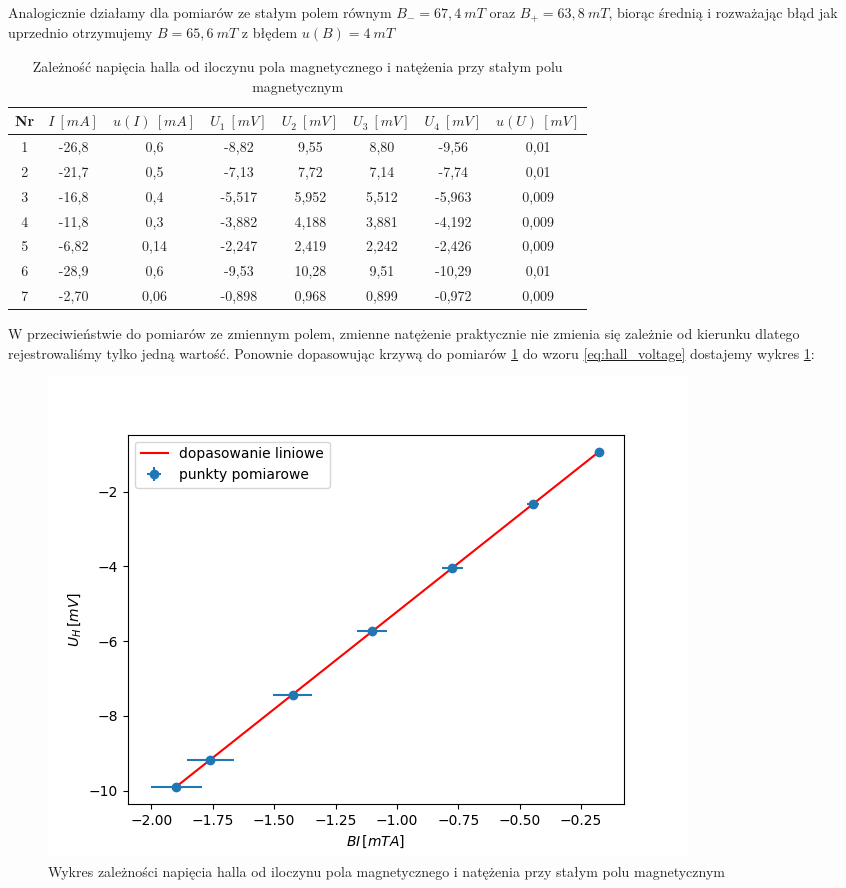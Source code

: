 \documentclass[12pt]{article}
\begin{document}
Analogicznie działamy dla pomiarów ze stałym polem równym $B_- = 67{,}4 \ mT$ oraz $B_+ = 63{,}8 \ mT$, biorąc średnią i rozważając błąd jak uprzednio otrzymujemy $B = 65{,}6 \ mT$ z błędem $u(B) = 4 \ mT$
\begin{table}[H]
    \centering
    \begin{tabular}{c|cc|ccccc}
        \toprule
        Nr & $I \ [mA]$ & $u(I) \ [mA]$ & $U_1 \ [mV]$ & $U_2 \ [mV]$ & $U_3 \ [mV]$ & $U_4 \ [mV]$ & $u(U) \ [mV]$ \\
        \midrule
        1 & -26{,}8 & 0{,}6 & -8{,}82 & 9{,}55 & 8{,}80 & -9{,}56 & 0{,}01 \\
        2 & -21{,}7 & 0{,}5 & -7{,}13 & 7{,}72 & 7{,}14 & -7{,}74 & 0{,}01 \\
        3 & -16{,}8 & 0{,}4 & -5{,}517 & 5{,}952 & 5{,}512 & -5{,}963 & 0{,}009 \\
        4 & -11{,}8 & 0{,}3 & -3{,}882 & 4{,}188 & 3{,}881 & -4{,}192 & 0{,}009 \\
        5 & -6{,}82  & 0{,}14 & -2{,}247 & 2{,}419 & 2{,}242 & -2{,}426 & 0{,}009 \\
        6 & -28{,}9 & 0{,}6 & -9{,}53 & 10{,}28 & 9{,}51 & -10{,}29 & 0{,}01 \\
        7 & -2{,}70  & 0{,}06 & -0{,}898 & 0{,}968 & 0{,}899 & -0{,}972 & 0{,}009 \\
        \bottomrule
    \end{tabular}
    \caption{Zależność napięcia halla od iloczynu pola magnetycznego i natężenia przy stałym polu magnetycznym}
    \label{tab:const_magnetic_field_measurements}
\end{table}
W przeciwieństwie do pomiarów ze zmiennym polem, zmienne natężenie praktycznie nie zmienia się zależnie od kierunku dlatego rejestrowaliśmy tylko jedną wartość.
Ponownie dopasowując krzywą do pomiarów \ref{tab:const_magnetic_field_measurements} do wzoru \ref{eq:hall_voltage} dostajemy wykres \ref{fig:const_field_measuremnts}: 
\begin{figure}[H]
    \centering
    \includegraphics[scale=0.5]{const_field}
    \caption{Wykres zależności napięcia halla od iloczynu pola magnetycznego i natężenia przy stałym polu magnetycznym}
    \label{fig:const_field_measuremnts}
\end{figure}
\end{document}
